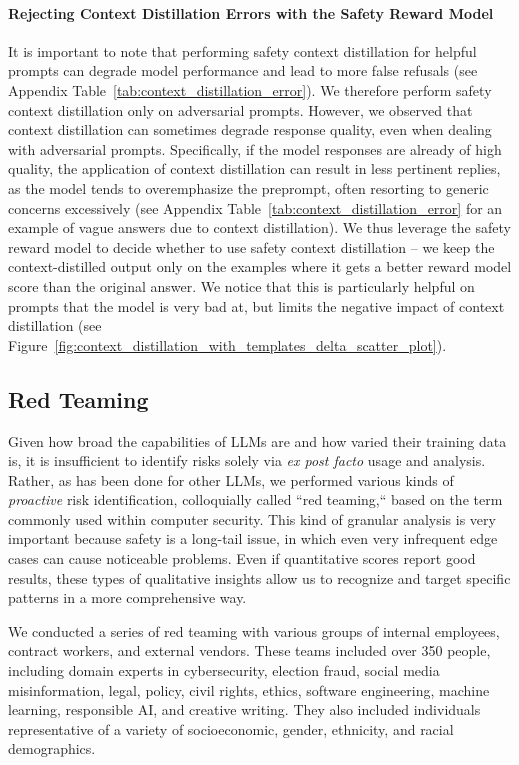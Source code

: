 \documentclass{article}
\begin{document}
\paragraph{Rejecting Context Distillation Errors with the Safety Reward Model}
It is important to note that performing safety context distillation for helpful prompts can degrade model performance and lead to more false refusals (see Appendix Table~\ref{tab:context_distillation_error}). 
We therefore perform safety context distillation only on adversarial prompts.
However, we observed that context distillation can sometimes degrade response quality, even when dealing with adversarial prompts. 
Specifically, if the model responses are already of high quality, the application of context distillation can result in less pertinent replies, as the model tends to overemphasize the preprompt, often resorting to generic concerns excessively (see Appendix Table~\ref{tab:context_distillation_error} for an example of vague answers due to context distillation).
We thus leverage the safety reward model to decide whether to use safety context distillation -- we keep the context-distilled output only on the examples where it gets a better reward model score than the original answer.
We notice that this is particularly helpful on prompts that the model is very bad at, but limits the negative impact of context distillation (see Figure~\ref{fig:context_distillation_with_templates_delta_scatter_plot}).

\subsection{Red Teaming}
\label{sec:red_teaming}

Given how broad the capabilities of LLMs are and how varied their training data is, it is insufficient to identify risks solely via {\em ex post facto} usage and analysis.
Rather, as has been done for other LLMs, we performed various kinds of {\em proactive} risk identification, colloquially called ``red teaming,`` based on the term commonly used within computer security.
This kind of granular analysis is very important because safety is a long-tail issue, in which even very infrequent edge cases can cause noticeable problems.
Even if quantitative scores report good results, these types of qualitative insights allow us to recognize and target specific patterns in a more comprehensive way.

We conducted a series of red teaming with various groups of internal employees, contract workers, and external vendors. These teams included over 350 people, including domain experts in cybersecurity, election fraud, social media misinformation, legal, policy, civil rights, ethics, software engineering, machine learning, responsible AI, and creative writing. They also included individuals representative of a variety of socioeconomic, gender, ethnicity, and racial demographics.
\end{document}

